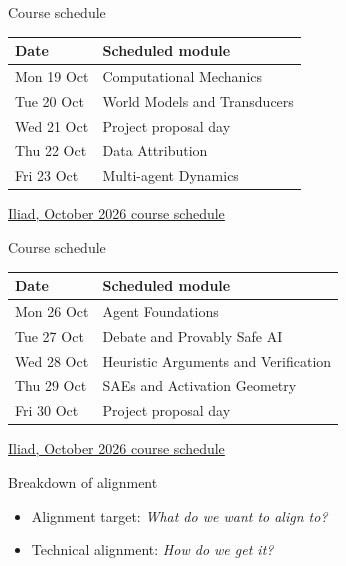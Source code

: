 \documentclass[aspectratio=169,11pt]{beamer}
\newcommand{\sources}[1]{\vfill{\fontsize{6.3}{7.5}\selectfont\color{muted}#1\par}}
\begin{document}
\begin{frame}[t,label=course3]{Course schedule}
\small\renewcommand{\arraystretch}{1.38}\setlength{\tabcolsep}{3pt}
\begin{tabular}{@{}>{\raggedright\arraybackslash}p{}>{\raggedright\arraybackslash}p{}@{}}\toprule
\textbf{Date} & \textbf{Scheduled module}\\\midrule
Mon 19 Oct & Computational Mechanics\\
Tue 20 Oct & World Models and Transducers\\
Wed 21 Oct & Project proposal day\\
Thu 22 Oct & Data Attribution\\
Fri 23 Oct & Multi-agent Dynamics\\
\bottomrule\end{tabular}
\sources{\href{https://iliad-teachers.pages.dev/schedule}{Iliad, October 2026 course schedule}}
\end{frame}

\begin{frame}[t,label=course4]{Course schedule}
\small\renewcommand{\arraystretch}{1.38}\setlength{\tabcolsep}{3pt}
\begin{tabular}{@{}>{\raggedright\arraybackslash}p{}>{\raggedright\arraybackslash}p{}@{}}\toprule
\textbf{Date} & \textbf{Scheduled module}\\\midrule
Mon 26 Oct & Agent Foundations\\
Tue 27 Oct & Debate and Provably Safe AI\\
Wed 28 Oct & Heuristic Arguments and Verification\\
Thu 29 Oct & SAEs and Activation Geometry\\
Fri 30 Oct & Project proposal day\\
\bottomrule\end{tabular}

\sources{\href{https://iliad-teachers.pages.dev/schedule}{Iliad, October 2026 course schedule}}
\end{frame}

\begin{frame}[t,label=targets]{Breakdown of alignment}
\begin{itemize}\setlength{\itemsep}{3.5mm}
\item Alignment target: \textit{What do we want to align to?}
\item Technical alignment: \textit{How do we get it?}
\end{itemize}
\end{frame}
\end{document}
